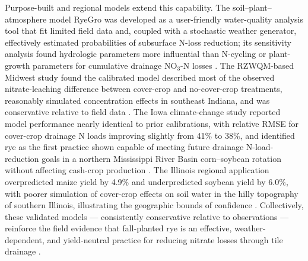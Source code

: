 \documentclass[11pt]{article}
\begin{document}
Purpose-built and regional models extend this capability. The soil--plant--atmosphere model RyeGro was developed as a user-friendly water-quality analysis tool that fit limited field data and, coupled with a stochastic weather generator, effectively estimated probabilities of subsurface N-loss reduction; its sensitivity analysis found hydrologic parameters more influential than N-cycling or plant-growth parameters for cumulative drainage NO$_3$-N losses \parencite{Feyereisen2006b}. The RZWQM-based Midwest study found the calibrated model described most of the observed nitrate-leaching difference between cover-crop and no-cover-crop treatments, reasonably simulated concentration effects in southeast Indiana, and was conservative relative to field data \parencite{Malone2014b}. The Iowa climate-change study reported model performance nearly identical to prior calibrations, with relative RMSE for cover-crop drainage N loads improving slightly from 41\% to 38\%, and identified rye as the first practice shown capable of meeting future drainage N-load-reduction goals in a northern Mississippi River Basin corn--soybean rotation without affecting cash-crop production \parencite{Malone2020}. The Illinois regional application overpredicted maize yield by 4.9\% and underpredicted soybean yield by 6.0\%, with poorer simulation of cover-crop effects on soil water in the hilly topography of southern Illinois, illustrating the geographic bounds of confidence \parencite{Gupta2023b}. Collectively, these validated models --- consistently conservative relative to observations \parencite{Malone2014b,Malone2018} --- reinforce the field evidence that fall-planted rye is an effective, weather-dependent, and yield-neutral practice for reducing nitrate losses through tile drainage \parencite{Chatterjee2025,MartinezFeria2016,Yang2021}.

\printbibliography
\end{document}

